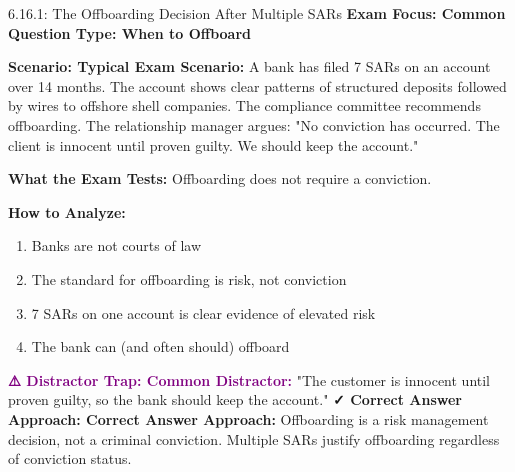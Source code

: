 \documentclass[11pt,a4paper]{beamer}
\newcommand{\examfocus}[1]{\textcolor{orange!80!black}{\textbf{Exam Focus: #1}}}
\newcommand{\trap}[1]{\textcolor{purple}{\textbf{⚠️ Distractor Trap: #1}}}
\newcommand{\correct}[1]{\textcolor{green!50!black}{\textbf{✓ Correct Answer Approach: #1}}}
\newcommand{\scenario}[1]{\textcolor{blue!70!black}{\textbf{Scenario: #1}}}
\begin{document}
	\begin{frame}{6.16.1: The Offboarding Decision After Multiple SARs}
		\examfocus{Common Question Type: When to Offboard}
		
		\scenario{Typical Exam Scenario:}
		A bank has filed 7 SARs on an account over 14 months. The account shows clear patterns of structured deposits followed by wires to offshore shell companies. The compliance committee recommends offboarding. The relationship manager argues: "No conviction has occurred. The client is innocent until proven guilty. We should keep the account."
		
		\textbf{What the Exam Tests:} Offboarding does not require a conviction.
		
		\textbf{How to Analyze:}
		\begin{enumerate}
			\item Banks are not courts of law
			\item The standard for offboarding is risk, not conviction
			\item 7 SARs on one account is clear evidence of elevated risk
			\item The bank can (and often should) offboard
		\end{enumerate}
		
		\trap{Common Distractor:} "The customer is innocent until proven guilty, so the bank should keep the account."
		\correct{Correct Answer Approach:} Offboarding is a risk management decision, not a criminal conviction. Multiple SARs justify offboarding regardless of conviction status.
	\end{frame}
	
	
\end{document}
